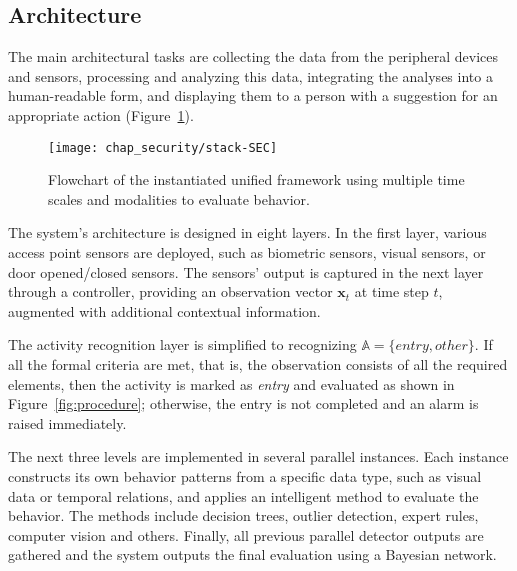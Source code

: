 \subsection{Architecture}
\label{sec:system:architecture}

The main architectural tasks are collecting the data from the peripheral devices and sensors, processing and analyzing this data, integrating the analyses into a human-readable form, and displaying them to a person with a suggestion for an appropriate action (Figure~\ref{fig:architecture}). 


\begin{figure}[!ht]
\centering
\texttt{[image: chap\_security/stack-SEC]}
\caption{Flowchart of the instantiated unified framework using multiple time scales and modalities to evaluate behavior.}
\label{fig:architecture}
\end{figure}



The system's architecture is designed in eight layers. In the first layer, various access point sensors are deployed, such as biometric sensors, visual sensors, or door opened/closed sensors. The sensors' output is captured in the next layer through a controller, providing an observation vector $\mathbf{x}_t$ at time step $t$, augmented with additional contextual information.

The activity recognition layer is simplified to recognizing $\mathbb{A}=\{entry, other\}$. If all the formal criteria are met, that is, the observation consists of all the required elements, then the activity is marked as \textit{entry} and evaluated as shown in Figure~\ref{fig:procedure}; otherwise, the entry is not completed and an alarm is raised immediately.

The next three levels are implemented in several parallel instances. Each instance constructs its own behavior patterns from a specific data type, such as visual data or temporal relations,  and applies an intelligent method to evaluate the behavior. The methods include decision trees, outlier detection, expert rules, computer vision and others. Finally, all previous parallel detector outputs are gathered and the system outputs the final evaluation using a Bayesian network.


